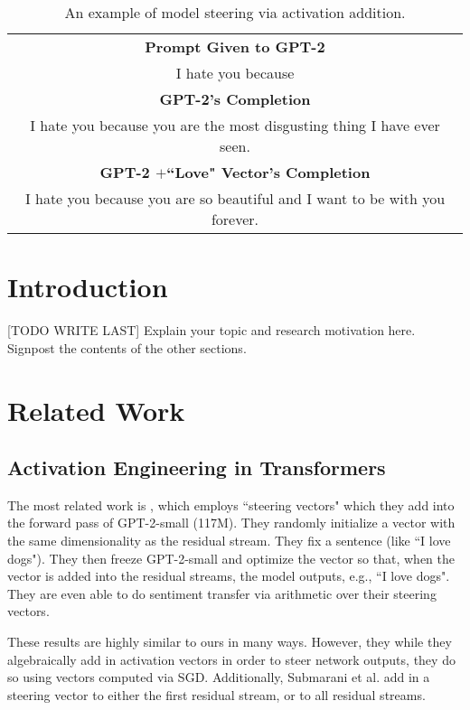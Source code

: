 \documentclass[10pt]{article}
\begin{document}
\begin{table}
	\centering
	\vskip 0.1in
	\caption{An example of model steering via activation addition.}
	\vskip 0.1in
	\label{tab:table1}
	
	\begin{tabulary}{\columnwidth}{C}
	 \textbf{Prompt Given to GPT-2} \\
	I hate you because \\
	 \textbf{GPT-2's Completion} \\
	I hate you because you are the most disgusting thing I have ever seen. \\
	 \textbf{GPT-2 $+$``Love" Vector's Completion} \\
	I hate you because you are so beautiful and I want to be with you forever.
	\end{tabulary}
\end{table}


\section{Introduction}
[TODO WRITE LAST] Explain your topic and research motivation here. Signpost the contents of the other sections.


\section{Related Work}
\subsection{Activation Engineering in Transformers}
The most related work is \citet{subramani-etal-2022-extracting}, which employs ``steering vectors" which they add into the forward pass of GPT-2-small (117M). They randomly initialize a vector with the same dimensionality as the residual stream. They fix a sentence (like ``I love dogs"). They then freeze GPT-2-small and optimize the vector so that, when the vector is added into the residual streams, the model outputs, e.g., ``I love dogs". They are even able to do sentiment transfer via arithmetic over their steering vectors.

These results are highly similar to ours in many ways. However, they while they algebraically add in activation vectors in order to steer network outputs, they do so using vectors computed via SGD. Additionally, Submarani et al. add in a steering vector to either the first residual stream, or to all residual streams. 
\end{document}
